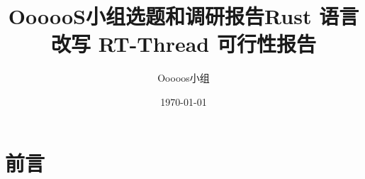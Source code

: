 \documentclass[12pt]{ctexart}
\title{OooooS小组选题和调研报告}
\title{Rust 语言改写 RT-Thread 可行性报告}
\author{Ooooos小组}
\date{\today}
\begin{document}
\maketitle

\section{前言}

\newpage
\tableofcontents
\newpage

%  

\newpage
\nocite{*}


\end{document}
